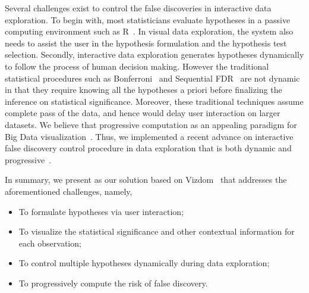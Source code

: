 Several challenges exist to control the false discoveries in interactive data exploration.  To begin with, most statisticians evaluate hypotheses in a passive computing environment such as R~\cite{R}. In visual data exploration, the system also needs to assist the user in the hypothesis formulation and the hypothesis test selection. Secondly, interactive data exploration generates hypotheses dynamically to follow the process of human decision making.  However the traditional statistical procedures such as Bonferroni~\cite{bonferroni1936teoria} and Sequential FDR~\cite{seq-fdr} are not dynamic in that they require knowing all the hypotheses a priori before finalizing the inference on statistical significance.  Moreover, these traditional techniques assume complete pass of the data, and hence would delay user interaction on larger datasets.  We believe that progressive computation as an appealing paradigm for Big Data visualization~\cite{emanuel-user-study, online-aggregation, vizdom}.  Thus, we implemented a recent advance on interactive false discovery control procedure in data exploration that is both dynamic and progressive~\cite{controlling-false-discoveries}.

In summary, we present \system{} as our solution based on Vizdom~\cite{vizdom} that addresses the aforementioned challenges, namely,
\begin{itemize}
    \item To formulate hypotheses via user interaction;
    \item To visualize the statistical significance and other contextual information for each observation;
    \item To control multiple hypotheses dynamically during data exploration;
    \item To progressively compute the risk of false discovery.
\end{itemize}
